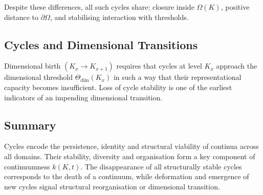 Despite these differences, all such cycles share:
closure inside \(\Omega(K)\), positive distance to \(\partial\Omega\),
and stabilising interaction with thresholds.

\subsection{Cycles and Dimensional Transitions}

Dimensional birth \((K_x\to K_{x+1})\) requires that cycles at level \(K_x\)
approach the dimensional threshold \(\Theta_{\mathrm{dim}}(K_x)\)
in such a way that their representational capacity becomes insufficient.  
Loss of cycle stability is one of the earliest indicators of an impending
dimensional transition.

\subsection{Summary}

Cycles encode the persistence, identity and structural viability
of continua across all domains.  
Their stability, diversity and organisation form a key component of
continuumness \(k(K,t)\).
The disappearance of all structurally stable cycles corresponds to
the death of a continuum, while deformation and emergence of new cycles
signal structural reorganisation or dimensional transition.
